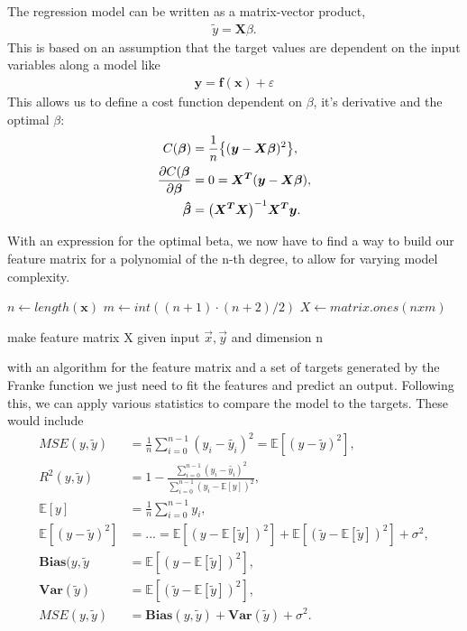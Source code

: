 \documentclass[12pt]{revtex4-2}
\begin{document}
The regression model can be written as a matrix-vector product,
\begin{align}
	\tilde{y} = \mathbf{X}\beta.
\end{align}
This is based on an assumption that the target values are dependent on the input 
variables along a model like
\begin{align}
	\mathbf{y} = \mathbf{f(x)} + \varepsilon
\end{align}
This allows us to define a cost function dependent on $\beta$, it's derivative and the
optimal $\beta$:\cite{hastie2009elements} \cite{morten2020lecturenotes}
\begin{align}
	C(\bm{\beta}) &= \frac{1}{n} \big\{ ( \bm{y} - \bm{X}\bm{\beta} )^2 \big\} ,
	\label{costfunc}\\
	\pdv{C(\bm{\beta}}{\bm{\beta}} &= 0 = \bm{X^T}\qty(\bm{y} - \bm{X}\bm{\beta}), \\
	\bm{\hat{\beta}} &= \qty(\bm{X^T}\bm{X})^{-1} \bm{X^T}\bm{y}.
	 \label{betaoptimal}
\end{align}

With an expression for the optimal beta, we now have to find a way to build our 
feature matrix for a polynomial of the n-th degree, to allow for varying model 
complexity.

\begin{algorithm}
	\DontPrintSemicolon
	$n \gets length(\bm{x})$\;
	$m \gets int((n+1)\cdot (n+2)/2)$\;
	$X \gets matrix.ones(nxm)$\;
	\;
\caption{make feature matrix X given input $\vec{x}, \vec{y}$ and dimension n}
\label{alg:design}
\end{algorithm}
with an algorithm for the feature matrix and a set of targets generated by the Franke 
function we just need to fit the features and predict an output. Following this, we can 
apply various statistics to compare the model to the targets. These would include
\begin{align}
	MSE(y, \tilde{y}) &= \frac{1}{n}\sum_{i=0}^{n-1}(y_i - \tilde{y_i})^2
		= \mathbb{E}[(y - \tilde{y})^2],
		\label{MSE} \\
	R^2(y, \tilde{y}) &= 1 - \frac{\sum_{i=0}^{n-1}(y_i - \tilde{y_i})^2}
		{\sum_{i=0}^{n-1}(y_i - \mathbb{E}[y])^2} 
		\label{R2}, \\
	\mathbb{E}[y] &= \frac{1}{n}\sum_{i=0}^{n-1} y_i \label{mean}, \\
	\mathbb{E}[(y - \tilde{y})^2] 
		&=...= \mathbb{E}[(y -\mathbb{E}[\tilde{y}])^2] 
			+ \mathbb{E}[(\tilde{y} - \mathbb{E}[\tilde{y}])^2] 
			+ \sigma^2 \label{bias-variance-error}, \\
	\mathbf{Bias}(y, \tilde{y} &= \mathbb{E}[(y -\mathbb{E}[\tilde{y}])^2] ,
		\label{bias} \\
	\mathbf{Var}(\tilde{y}) &= \mathbb{E}[(\tilde{y} - \mathbb{E}[\tilde{y}])^2] ,
		\label{variance} \\
	MSE(y, \tilde{y}) &= \mathbf{Bias}(y, \tilde{y}) + \mathbf{Var}(\tilde{y}) + \sigma^2
		\label{bias-variance}.
\end{align}
\end{document}
